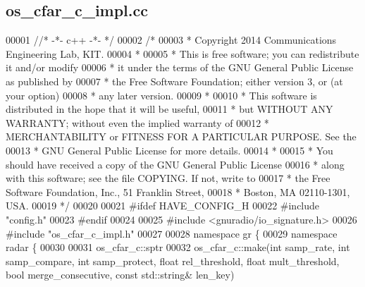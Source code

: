 \subsection{os\+\_\+cfar\+\_\+c\+\_\+impl.\+cc}
\label{os__cfar__c__impl_8cc_source}

\begin{DoxyCode}
00001 \textcolor{comment}{//* -*- c++ -*- */}
00002 \textcolor{comment}{/* }
00003 \textcolor{comment}{ * Copyright 2014 Communications Engineering Lab, KIT.}
00004 \textcolor{comment}{ * }
00005 \textcolor{comment}{ * This is free software; you can redistribute it and/or modify}
00006 \textcolor{comment}{ * it under the terms of the GNU General Public License as published by}
00007 \textcolor{comment}{ * the Free Software Foundation; either version 3, or (at your option)}
00008 \textcolor{comment}{ * any later version.}
00009 \textcolor{comment}{ * }
00010 \textcolor{comment}{ * This software is distributed in the hope that it will be useful,}
00011 \textcolor{comment}{ * but WITHOUT ANY WARRANTY; without even the implied warranty of}
00012 \textcolor{comment}{ * MERCHANTABILITY or FITNESS FOR A PARTICULAR PURPOSE.  See the}
00013 \textcolor{comment}{ * GNU General Public License for more details.}
00014 \textcolor{comment}{ * }
00015 \textcolor{comment}{ * You should have received a copy of the GNU General Public License}
00016 \textcolor{comment}{ * along with this software; see the file COPYING.  If not, write to}
00017 \textcolor{comment}{ * the Free Software Foundation, Inc., 51 Franklin Street,}
00018 \textcolor{comment}{ * Boston, MA 02110-1301, USA.}
00019 \textcolor{comment}{ */}
00020  
00021 \textcolor{preprocessor}{#ifdef HAVE\_CONFIG\_H}
00022 \textcolor{preprocessor}{#include "config.h"}
00023 \textcolor{preprocessor}{#endif}
00024 
00025 \textcolor{preprocessor}{#include <gnuradio/io\_signature.h>}
00026 \textcolor{preprocessor}{#include "os_cfar_c_impl.h"}
00027 
00028 \textcolor{keyword}{namespace }gr \{
00029   \textcolor{keyword}{namespace }radar \{
00030 
00031     os_cfar_c::sptr
00032     os_cfar_c::make(\textcolor{keywordtype}{int} samp_rate, \textcolor{keywordtype}{int} samp\_compare, \textcolor{keywordtype}{int} samp\_protect, \textcolor{keywordtype}{float} rel\_threshold, \textcolor{keywordtype}{float} 
      mult\_threshold, \textcolor{keywordtype}{bool} merge\_consecutive, \textcolor{keyword}{const} std::string& len\_key)

\end{DoxyCode}
